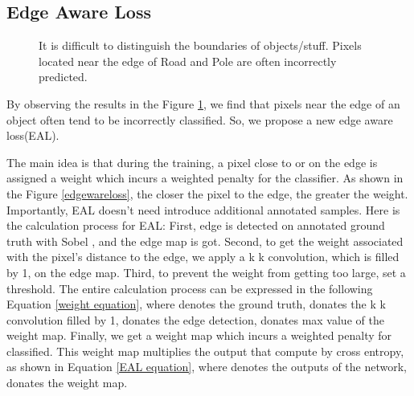 \documentclass[final]{cvpr}
\begin{document}
\subsection{Edge Aware Loss}


\begin{figure}
\begin{center}
\end{center}
\caption{ It is difficult to distinguish the boundaries of objects/stuff. Pixels located near the edge of Road and Pole are often incorrectly predicted. }
\label{EAL_error}
\end{figure}



By observing the results in the Figure \ref{EAL_error}, we find that pixels near the edge of an object often tend to be incorrectly classified. So, we propose a new edge aware loss(EAL).

The main idea is that during the training, a pixel close to or on the edge is assigned a weight which incurs a weighted penalty for the classifier. As shown in the Figure \ref{edgewareloss}, the closer the pixel to the edge, the greater the weight. Importantly, EAL doesn't need introduce additional annotated samples. Here is the calculation process for EAL: First, edge is detected on annotated ground truth with Sobel \cite{Duda1973Pattern}, and the edge map is got. Second, to get the weight associated with the pixel's distance to the edge, we apply a k  k convolution, which is filled by 1, on the edge map. Third, to prevent the weight from getting too large, set a threshold. The entire calculation process can be expressed in the following Equation \ref{weight equation}, where  denotes the ground truth,  donates the k  k convolution filled by 1,  donates the edge detection,  donates max value of the weight map. Finally, we get a weight map which incurs a weighted penalty for classified. This weight map multiplies the output that compute by cross entropy, as shown in Equation \ref{EAL equation}, where  denotes the outputs of the network,  donates the weight map.
\end{document}
